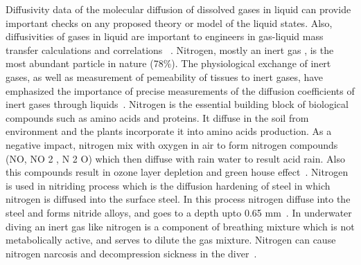 \begin{sloppypar}
\end{sloppypar}


Diffusivity data of the molecular diffusion of dissolved gases in liquid can provide important checks on any proposed theory or model of the liquid states. Also, diffusivities
of gases in liquid are important to engineers in gas-liquid mass transfer calculations and
correlations~ \citep{himmelblau1964}. Nitrogen, mostly an inert gas , is the most abundant particle in nature (78\%). The physiological exchange of inert gases, as well as measurement of pemeability
of tissues to inert gases, have emphasized the importance of precise measurements of the
diffusion coefficients of inert gases through liquids~\citep{smith1955experimental}. Nitrogen is the essential building
block of biological compounds such as amino acids and proteins. It diffuse in the soil from
environment and the plants incorporate it into amino acids production. As a negative
impact, nitrogen mix with oxygen in air to form nitrogen compounds (NO, NO 2 , N 2 O)
which then diffuse with rain water to result acid rain. Also this compounds result in
ozone layer depletion and green house effect~\citep{yung1976greenhouse}.
Nitrogen is used in nitriding process which is the diffusion hardening of steel in which
nitrogen is diffused into the surface steel. In this process nitrogen diffuse into the steel
and forms nitride alloys, and goes to a depth upto 0.65 mm~\citep{venugopalan2000effect}.
In underwater diving an inert gas like nitrogen is a component of breathing mixture
which is not metabolically active, and serves to dilute the gas mixture. Nitrogen can cause nitrogen narcosis and decompression sickness in the diver~\citep{rommel2006elements}.

